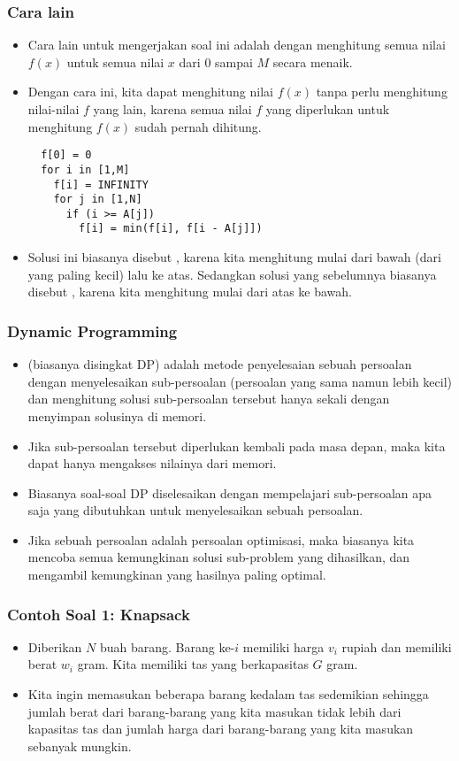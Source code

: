 \begin{frame} [fragile]
\frametitle{Cara lain}
\begin{itemize}
  \item Cara lain untuk mengerjakan soal ini adalah dengan menghitung semua nilai $f(x)$ untuk semua nilai $x$ dari $0$ sampai $M$ secara menaik.
  \item Dengan cara ini, kita dapat menghitung nilai $f(x)$ tanpa perlu menghitung nilai-nilai $f$ yang lain, karena semua nilai $f$ yang diperlukan untuk menghitung $f(x)$ sudah pernah dihitung.
\begin{lstlisting}
  f[0] = 0
  for i in [1,M]
    f[i] = INFINITY
    for j in [1,N]
      if (i >= A[j])
        f[i] = min(f[i], f[i - A[j]])
\end{lstlisting}
  \item Solusi ini biasanya disebut , karena kita menghitung mulai dari bawah (dari yang paling kecil) lalu ke atas. Sedangkan solusi yang sebelumnya biasanya disebut , karena kita menghitung mulai dari atas ke bawah.
\end{itemize}
\end{frame}

\begin{frame} 
\frametitle{Dynamic Programming}
\begin{itemize}
  \item {} (biasanya disingkat DP) adalah metode penyelesaian sebuah persoalan dengan menyelesaikan sub-persoalan (persoalan yang sama namun lebih kecil) dan menghitung solusi sub-persoalan tersebut hanya sekali dengan menyimpan solusinya di memori.
  \item Jika sub-persoalan tersebut diperlukan kembali pada masa depan, maka kita dapat hanya mengakses nilainya dari memori.
  \item Biasanya soal-soal DP diselesaikan dengan mempelajari sub-persoalan apa saja yang dibutuhkan untuk menyelesaikan sebuah persoalan.
  \item Jika sebuah persoalan adalah persoalan optimisasi, maka biasanya kita mencoba semua kemungkinan solusi sub-problem yang dihasilkan, dan  mengambil kemungkinan yang hasilnya paling optimal. 
\end{itemize}
\end{frame}

\begin{frame} 
\frametitle{Contoh Soal 1: Knapsack}
\begin{itemize}
  \item Diberikan $N$ buah barang. Barang ke-$i$ memiliki harga $v_i$ rupiah dan memiliki berat $w_i$ gram. Kita memiliki tas yang berkapasitas $G$ gram. 
  \item Kita ingin memasukan beberapa barang kedalam tas sedemikian sehingga jumlah berat dari barang-barang yang kita masukan tidak lebih dari kapasitas tas dan jumlah harga dari barang-barang yang kita masukan sebanyak mungkin.
\end{itemize}
\end{frame}

